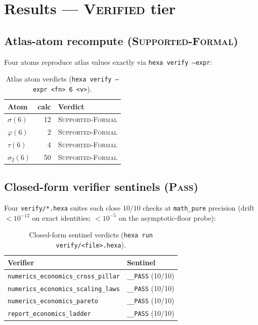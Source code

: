 \documentclass[11pt,a4paper]{article}
\begin{document}
\section{Results --- \textsc{Verified} tier}
\label{sec:verified}

\subsection{Atlas-atom recompute (\textsc{Supported-Formal})}

Four atoms reproduce atlas values exactly via \texttt{hexa verify --expr}:

\begin{table}[h]
\centering
\caption{Atlas atom verdicts (\texttt{hexa verify --expr <fn> 6 <v>}).}
\label{tab:atoms}
\begin{tabular}{lrl}
\toprule
\textbf{Atom} & \textbf{calc} & \textbf{Verdict} \\
\midrule
$\sigma(6)$    & 12 & \textsc{Supported-Formal} \\
$\varphi(6)$   &  2 & \textsc{Supported-Formal} \\
$\tau(6)$      &  4 & \textsc{Supported-Formal} \\
$\sigma_2(6)$  & 50 & \textsc{Supported-Formal} \\
\bottomrule
\end{tabular}
\end{table}

\subsection{Closed-form verifier sentinels (\textsc{Pass})}

Four \texttt{verify/*.hexa} suites each close $10/10$ checks at
\texttt{math\_pure} precision (drift $< 10^{-12}$ on exact identities;
$< 10^{-5}$ on the asymptotic-floor probe):

\begin{table}[h]
\centering
\caption{Closed-form sentinel verdicts (\texttt{hexa run verify/<file>.hexa}).}
\label{tab:sentinels}
\begin{tabular}{ll}
\toprule
\textbf{Verifier} & \textbf{Sentinel} \\
\midrule
\texttt{numerics\_economics\_cross\_pillar} & \texttt{\_\_PASS} (10/10) \\
\texttt{numerics\_economics\_scaling\_laws} & \texttt{\_\_PASS} (10/10) \\
\texttt{numerics\_economics\_pareto}        & \texttt{\_\_PASS} (10/10) \\
\texttt{report\_economics\_ladder}          & \texttt{\_\_PASS} (10/10) \\
\bottomrule
\end{tabular}
\end{table}
\end{document}
